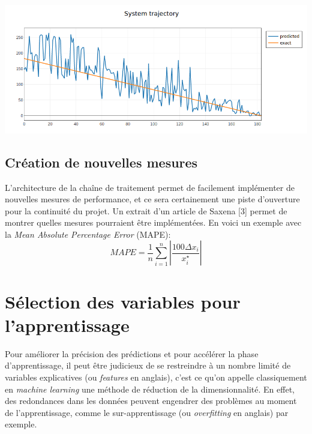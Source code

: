 \begin{center}
\includegraphics[scale=0.45]{figures/system_trajectory.png}
\label{fig13}
\end{center}

\subsection{Création de nouvelles mesures}

L’architecture de la chaîne de traitement permet de facilement implémenter de nouvelles mesures de performance, et ce sera certainement une piste d’ouverture pour la continuité du projet. Un extrait d’un article de Saxena [3] permet de montrer quelles mesures pourraient être implémentées. En voici un exemple avec la \textit{Mean Absolute Percentage Error} (MAPE):
$$MAPE =\frac{1}{n}\sum_{i=1}^{n} \left \lvert \frac{100\Delta x_{i}}{x^{\star}_{i}} \right \rvert $$

\section{Sélection des variables pour l’apprentissage}

Pour améliorer la précision des prédictions et pour accélérer la phase d’apprentissage, il peut être judicieux de se restreindre à un nombre limité de variables explicatives (ou \textit{features} en anglais), c’est ce qu’on appelle classiquement en \textit{machine learning} une méthode de réduction de la dimensionnalité. En effet, des redondances dans les données peuvent engendrer des problèmes au moment de l’apprentissage, comme le sur-apprentissage (ou \textit{overfitting} en anglais) par exemple.

